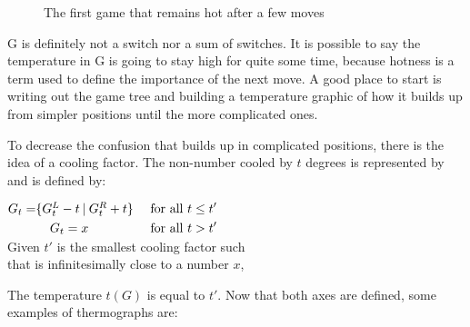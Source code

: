 \begin{figure}[H]
\begin{center}
\end{center}
\caption{The first game that remains hot after a few moves}
\end{figure}

G is definitely not a switch nor a sum of switches. It is possible to say the temperature in G is going to stay high for quite some time, because hotness is a term used to define the importance of the next move. A good place to start is writing out the game tree and building a temperature graphic of how it builds up from simpler positions until the more complicated ones.

To decrease the confusion that builds up in complicated positions, there is the idea of a cooling factor. The non-number \Gm{} cooled by $t$ degrees is represented by  and is defined by:
\begin{center}
	$
	\begin{aligned}
		\mbox{$G_t$} = &\mbox{$\{\mbox{$G^L_t$} - t\:|\:\mbox{$G^R_t$} + t\}$} & \text{ for all } t \leq t' \\
		&\;\;\;\;\mbox{$G_t$} = x & \text{ for all } t > t'
	\end{aligned}
	$\\\vspace{0.5cm}
	Given $t'$ is the smallest cooling factor such\\
	that  is infinitesimally close to a number $x$,
\end{center}

The temperature $t(G)$ is equal to $t'$. Now that both axes are defined, some examples of thermographs are:



